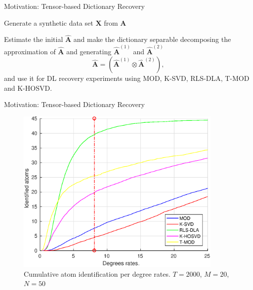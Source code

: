 \documentclass[newPxFont, numfooter, sectionpages]{beamer}
\begin{document}
\begin{frame}[c]{Motivation: Tensor-based Dictionary Recovery}

	Generate a synthetic data set $\textbf{X}$ from $\textbf{A}$

	Estimate the initial $\hat{\textbf{A}}$ and make the dictionary separable decomposing the approximation of $\hat{\textbf{A}}$ and generating $\hat{\textbf{A}}^{(1)}$ and $\hat{\textbf{A}}^{(2)}$
	\begin{equation}\label{eq:4_eq04}
		\hat{\textbf{A}} = (\hat{\textbf{A}}^{(1)} \otimes \hat{\textbf{A}}^{(2)}),
	\end{equation}
	and use it for DL recovery experiments using MOD, K-SVD, RLS-DLA, T-MOD and K-HOSVD. 

\end{frame}
\begin{frame}[c]{Motivation: Tensor-based Dictionary Recovery}
	\begin{figure}[!htb]
		\centering 
		\includegraphics[width=10cm]{../figures/ch4/s=5_snr=20_L=2000_noIt=100_N=20_K=50.eps}
		\caption{Cumulative atom identification per degree rates. $T=2000$, $M=20$, $N=50$}
		\label{fig:fig1}
	\end{figure}
\end{frame}
\end{document}
